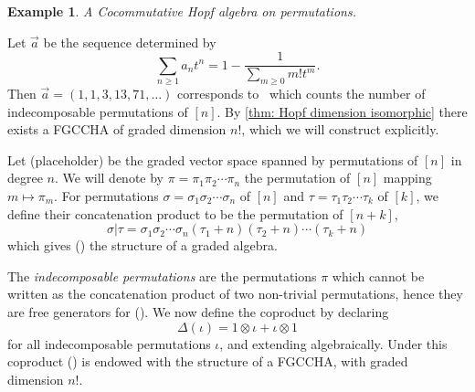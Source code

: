 \documentclass[11pt]{amsart}
\theoremstyle{definition}
\newtheorem{example}[theorem]{Example}
\numberwithin{equation}{section}
\begin{document}
\begin{example}\textit{A Cocommutative Hopf algebra on permutations.}

    Let $\vec{a}$ be the sequence determined by
    \[
    \sum_{n \geq 1}a_nt^n = 1 - \frac{1}{\sum_{m \geq 0}m!t^m}.
    \]
    Then $\vec{a} = (1,1,3,13,71,\ldots)$ corresponds to~\cite[A003319]{OEIS} which counts the number of indecomposable permutations of $[n]$. By \ref{thm: Hopf dimension isomorphic} there exists a \textsf{FGCCHA} of graded dimension $n!$, which we will construct explicitly.

    Let (placeholder) be the graded vector space spanned by permutations of $[n]$ in degree $n$. We will denote by $\pi = \pi_1\pi_2\cdots\pi_n$ the permutation of $[n]$ mapping $m \mapsto \pi_m$. For permutations $\sigma = \sigma_1\sigma_2\cdots\sigma_n$ of $[n]$ and $\tau = \tau_1\tau_2\cdots\tau_k$ of $[k]$, we define their concatenation product to be the permutation of $[n+k]$, 
    \[
    \sigma |\tau = \sigma_1\sigma_2\cdots\sigma_n(\tau_1 + n)(\tau_2+n)\cdots(\tau_k+n)
    \]
    which gives () the structure of a graded algebra. 
    
    The \textit{indecomposable permutations} are the permutations $\pi$ which cannot be written as the concatenation product of two non-trivial permutations, hence they are free generators for (). We now define the coproduct by declaring
    \[
    \Delta(\iota) = 1 \otimes \iota + \iota \otimes 1
    \]
    for all indecomposable permutations $\iota$, and extending algebraically. Under this coproduct () is endowed with the structure of a \textsf{FGCCHA}, with graded dimension $n!$.
\end{example}
\end{document}
